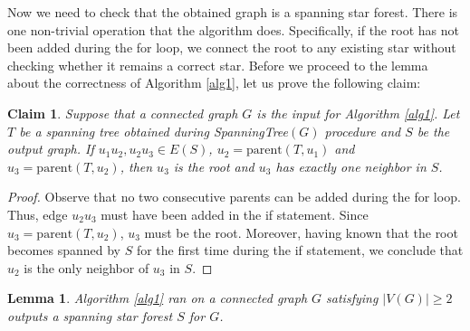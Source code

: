 \documentclass[en]{pracamgr}
\newtheorem{lemma}{Lemma}
\newtheorem{claim}{Claim}
\theoremstyle{definition}
\begin{document}
Now we need to check that the obtained graph is a spanning star forest. There is one non-trivial operation that the algorithm does. Specifically, if the root has not  been added during the for loop, we connect the root to any existing star without checking whether it remains a correct star. Before we proceed to the lemma about the correctness of Algorithm \ref{alg1}, let us prove the following claim:
\begin{claim}\label{ssf root}
	Suppose that a connected graph $G$ is the input for Algorithm \ref{alg1}. Let $T$ be a spanning tree obtained during \textrm{SpanningTree}$(G)$ procedure and $S$ be the output graph. If $u_1 u_2,u_2 u_3 \in E(S)$, $u_2 = \textrm{parent}(T,u_1)$ and $u_3=\textrm{parent}(T,u_2)$, then $u_3$ is the root and $u_3$ has exactly one neighbor in $S$.
\end{claim}

\begin{proof}
	Observe that no two consecutive parents can be added during the for loop. Thus, edge $u_2 u_3$ must have been added in the if statement. Since $u_3 = \textrm{parent}(T,u_2)$, $u_3$ must be the root. Moreover, having known that the root becomes spanned by $S$ for the first time during the if statement, we conclude that $u_2$ is the only neighbor of $u_3$ in $S$. 
\end{proof}

\begin{lemma}\label{alg1 correctness}
	Algorithm \ref{alg1} ran on a connected graph $G$ satisfying $|V(G)| \geq 2$ outputs a spanning star forest $S$ for $G$.
\end{lemma}
\end{document}
